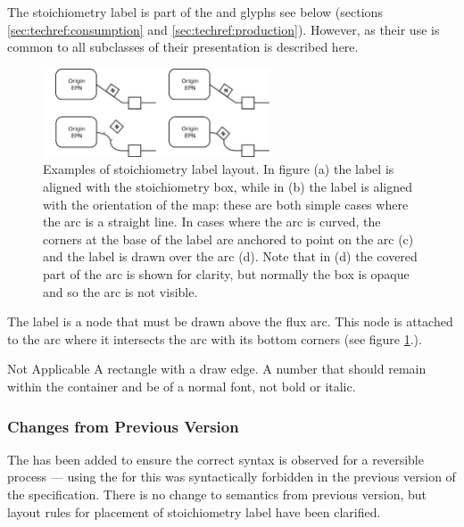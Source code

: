 The stoichiometry label is part of the  and
 glyphs see below (sections
\ref{sec:techref:consumption} and \ref{sec:techref:production}). However, as their use
is common to all subclasses of  their presentation
is described here.

\begin{figure}[htb]
  \centering
  \includegraphics[width=0.6\textwidth]{images/stoichlabellayout}
  \caption{Examples of stoichiometry label layout. In figure (a) the
    label is aligned with the stoichiometry box, while in (b) the
    label is aligned with the orientation of the map: these are both
    simple cases where the arc is a straight line. In cases where the
    arc is curved, the corners at the base of the label are anchored
    to point on the arc (c) and the label is drawn over the arc
    (d). Note that in (d) the covered part of the arc is shown for
    clarity, but normally the box is opaque and so the arc is not
    visible.}
  \label{fig:techref:stoichlabellayout}
\end{figure}

The label is a node that must be drawn above the flux arc. This node
is attached to the arc where it intersects the arc with its bottom
corners (see figure \ref{fig:techref:stoichlabellayout}.).

\begin{glyphDescription}
\glyphSboTerm Not Applicable
\glyphContainer A rectangle with a draw edge.
\glyphLabel A number that should remain within the container and be of
a normal font, \ie not bold or italic.
\end{glyphDescription}


\subsubsection{Changes from Previous Version}

The  has been added to ensure the correct syntax
is observed for a reversible process --- using the  for this was syntactically forbidden in the previous version of
the specification. There is no change to semantics from previous
version, but layout rules for placement of stoichiometry label have
been clarified.

